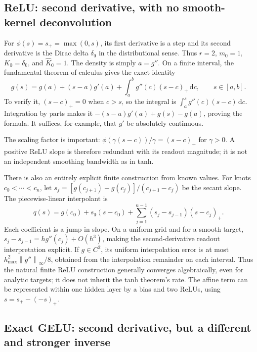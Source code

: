 \documentclass[11pt]{article}
\newcommand{\dd}{\,\mathrm d}
\newcommand{\norm}[1]{\left\lVert#1\right\rVert}
\begin{document}
\subsection{ReLU: second derivative, with no smooth-kernel deconvolution}

For $\phi(s)=s_+=\max(0,s)$, its first derivative is a step and its second derivative is the Dirac delta $\delta_0$ in the distributional sense. Thus $r=2$, $m_0=1$, $K_0=\delta_0$, and $\widehat K_0=1$. The density is simply $a=g''$. On a finite interval, the fundamental theorem of calculus gives the exact identity
\begin{equation}
 g(s)=g(a)+(s-a)g'(a)+\int_a^b g''(c)(s-c)_+\dd c,
 \qquad s\in[a,b].
 \label{eq:relu-identity}
\end{equation}
To verify it, $(s-c)_+=0$ when $c>s$, so the integral is
$\int_a^s g''(c)(s-c)\dd c$. Integration by parts makes it
$-(s-a)g'(a)+g(s)-g(a)$, proving the formula. It suffices, for example, that $g'$ be absolutely continuous.

The scaling factor is important: $\phi(\gamma(s-c))/\gamma=(s-c)_+$ for $\gamma>0$. A positive ReLU slope is therefore redundant with its readout magnitude; it is not an independent smoothing bandwidth as in tanh.

There is also an entirely explicit finite construction from known values. For knots $c_0<\cdots<c_n$, let
$s_j=[g(c_{j+1})-g(c_j)]/(c_{j+1}-c_j)$ be the secant slope. The piecewise-linear interpolant is
\[
 q(s)=g(c_0)+s_0(s-c_0)+
 \sum_{j=1}^{n-1}(s_j-s_{j-1})(s-c_j)_+.
\]
Each coefficient is a jump in slope. On a uniform grid and for a smooth target,
$s_j-s_{j-1}=h g''(c_j)+O(h^3)$, making the second-derivative readout interpretation explicit. If $g\in C^2$, its uniform interpolation error is at most
$h_{\max}^2\norm{g''}_\infty/8$, obtained from the interpolation remainder on each interval. Thus the natural finite ReLU construction generally converges algebraically, even for analytic targets; it does not inherit the tanh theorem's rate. The affine term can be represented within one hidden layer by a bias and two ReLUs, using $s=s_+-(-s)_+$.

\subsection{Exact GELU: second derivative, but a different and stronger inverse}
\end{document}
